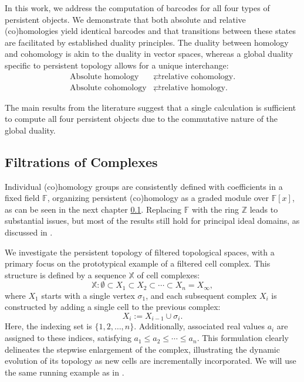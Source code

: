 In this work, we address the computation of barcodes for all four types of persistent objects. We demonstrate that both absolute and relative (co)homologies yield identical barcodes and that transitions between these states are facilitated by established duality principles. The duality between homology and cohomology is akin to the duality in vector spaces, whereas a global duality specific to persistent topology allows for a unique interchange:
\begin{align*}
	\text{Absolute homology} &\rightleftarrows \text{relative cohomology.} \\
	\text{Absolute cohomology} &\rightleftarrows \text{relative homology.}
\end{align*}

The main results from the literature suggest that a single calculation is sufficient to compute all four persistent objects due to the commutative nature of the global duality.

\subsection{Filtrations of Complexes}
Individual (co)homology groups are consistently defined with coefficients in a fixed field $\mathbb{F}$, organizing persistent (co)homology as a graded module over $\mathbb{F}[x]$, as can be seen in the next chapter \ref{}. Replacing $\mathbb{F}$ with the ring $\mathbb{Z}$ leads to substantial issues, but most of the results still hold for principal ideal domains, as discussed in \cite[§3.1]{zomorodian2004computing}.

We investigate the persistent topology of filtered topological spaces, with a primary focus on the prototypical example of a filtered cell complex. This structure is defined by a sequence \(\mathbb{X}\) of cell complexes:
\begin{equation*}
\mathbb{X} : \emptyset \subset X_1 \subset X_2 \subset \cdots \subset X_n = X_{\infty},
\end{equation*}
where \(X_1\) starts with a single vertex \( \sigma_1 \), and each subsequent complex \(X_i\) is constructed by adding a single cell to the previous complex:
\begin{equation*}
X_i := X_{i-1} \cup \sigma_i.
\end{equation*}
Here, the indexing set is \( \{1, 2, \ldots, n\} \). Additionally, associated real values \(a_i\) are assigned to these indices, satisfying $a_1 \leq a_2 \leq \cdots \leq a_n.$ This formulation clearly delineates the stepwise enlargement of the complex, illustrating the dynamic evolution of its topology as new cells are incrementally incorporated. We will use the same running example as in \cite[§2.2]{de2011dualities}.


